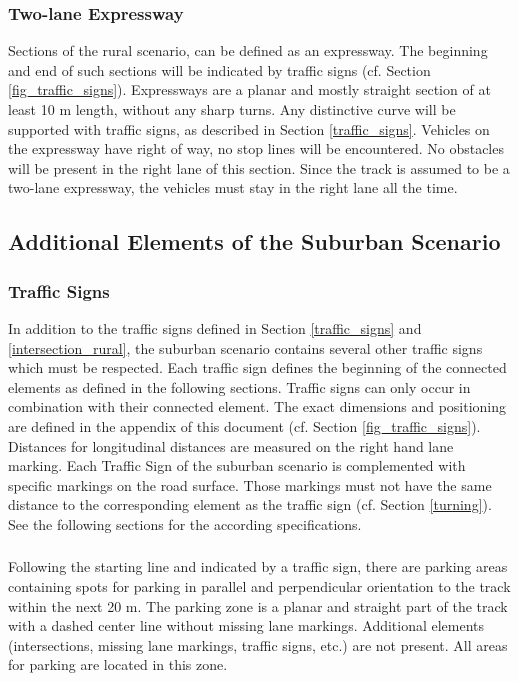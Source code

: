 \subsubsection{Two-lane Expressway}

Sections of the rural scenario, can be defined as an expressway. The beginning
and end of such sections will be indicated by traffic signs (cf. Section
\ref{fig_traffic_signs}). Expressways are a planar and mostly straight section
of at least 10 m length, without any sharp turns. Any distinctive curve will be
supported with traffic signs, as described in Section \ref{traffic_signs}.
Vehicles on the expressway have right of way, no stop lines will be
encountered. No obstacles will be present in the right lane of this section.
Since the track is assumed to be a two-lane expressway, the vehicles must stay
in the right lane all the time.

\subsection{Additional Elements of the Suburban Scenario}
\label{elements_suburban_scenario}
\subsubsection{Traffic Signs}

In addition to the traffic signs defined in Section \ref{traffic_signs} and
\ref{intersection_rural}, the suburban scenario contains several other traffic
signs which must be respected. Each traffic sign defines the beginning of the
connected elements as defined in the following sections. Traffic signs can only
occur in combination with their connected element. The exact dimensions and
positioning are defined in the appendix of this document (cf. Section
\ref{fig_traffic_signs}). Distances for longitudinal distances are measured on
the right hand lane marking. Each Traffic Sign of the suburban scenario is
complemented with specific markings on the road surface. Those markings must
not have the same distance to the corresponding element as the traffic sign
(cf. Section \ref{turning}). See the following sections for the according
specifications.

\subsubsection{}

Following the starting line and indicated by a traffic sign, there are parking
areas containing spots for parking in parallel and perpendicular orientation to
the track within the next 20 m. The parking zone is a planar and straight part
of the track with a dashed center line without missing lane markings.
Additional elements (intersections, missing lane markings, traffic signs, etc.)
are not present. All areas for parking are located in this zone.

